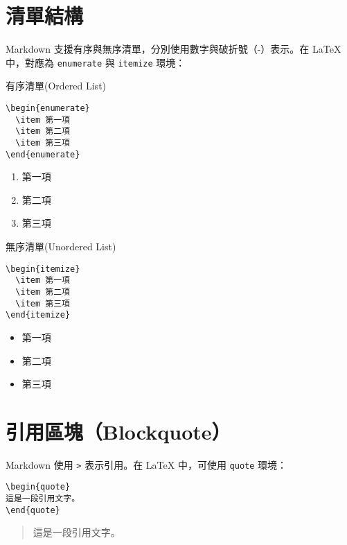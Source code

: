 \section{清單結構}

Markdown 支援有序與無序清單，分別使用數字與破折號（-）表示。在 LaTeX 中，對應為 \verb|enumerate| 與 \verb|itemize| 環境：

有序清單(Ordered List)
\begin{verbatim}
\begin{enumerate}
  \item 第一項
  \item 第二項
  \item 第三項
\end{enumerate}
\end{verbatim}

\begin{enumerate}
  \item 第一項
  \item 第二項
  \item 第三項
\end{enumerate}

無序清單(Unordered List)
\begin{verbatim}
\begin{itemize}
  \item 第一項
  \item 第二項
  \item 第三項
\end{itemize}
\end{verbatim}

\begin{itemize}
  \item 第一項
  \item 第二項
  \item 第三項
\end{itemize}

\section{引用區塊（Blockquote）}

Markdown 使用 \texttt{>} 表示引用。在 LaTeX 中，可使用 \verb|quote| 環境：

\begin{verbatim}
\begin{quote}
這是一段引用文字。
\end{quote}
\end{verbatim}

\begin{quote}
這是一段引用文字。
\end{quote}

